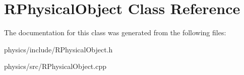 \hypertarget{classRPhysicalObject}{
\section{RPhysicalObject Class Reference}
\label{classRPhysicalObject}
}


The documentation for this class was generated from the following files:\begin{DoxyCompactItemize}
\item 
physics/include/RPhysicalObject.h\item 
physics/src/RPhysicalObject.cpp\end{DoxyCompactItemize}
